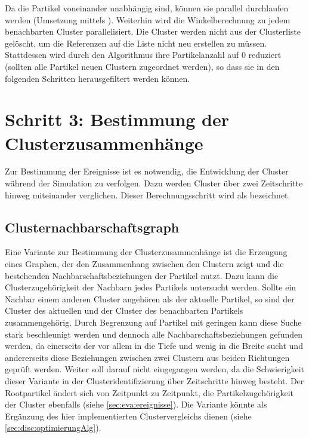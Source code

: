 Da die Partikel voneinander unabhängig sind, können sie parallel durchlaufen werden (Umsetzung mittels ). Weiterhin wird die Winkelberechnung zu jedem benachbarten Cluster parallelisiert.
Die Cluster werden nicht aus der Clusterliste gelöscht, um die Referenzen auf die Liste nicht neu erstellen zu müssen. Stattdessen wird durch den Algorithmus ihre Partikelanzahl auf 0 reduziert (sollten alle Partikel neuen Clustern zugeordnet werden), so dass sie in den folgenden Schritten herausgefiltert werden können.

\section{Schritt 3: Bestimmung der Clusterzusammenhänge}\label{sec:clusterzusammenhaenge}
Zur Bestimmung der Ereignisse ist es notwendig, die Entwicklung der Cluster während der Simulation zu verfolgen. Dazu werden Cluster über zwei Zeitschritte hinweg miteinander verglichen. Dieser Berechnungsschritt wird als \SECC bezeichnet.

\subsection*{Clusternachbarschaftsgraph}
Eine Variante zur Bestimmung der Clusterzusammenhänge ist die Erzeugung eines Graphen, der den Zusammenhang zwischen den Clustern zeigt und die bestehenden Nachbarschaftsbeziehungen der Partikel nutzt. Dazu kann die Clusterzugehörigkeit der Nachbarn jedes Partikels untersucht werden. Sollte ein Nachbar einem anderen Cluster angehören als der aktuelle Partikel, so sind der Cluster des aktuellen und der Cluster des benachbarten Partikels zusammengehörig. Durch Begrenzung auf Partikel mit geringen  kann diese Suche stark beschleunigt werden und dennoch alle Nachbarschaftsbeziehungen gefunden werden, da einerseits der \CFD vor allem in die Tiefe und wenig in die Breite sucht und andererseits diese Beziehungen zwischen zwei Clustern aus beiden Richtungen geprüft werden.
Weiter soll darauf nicht eingegangen werden, da die Schwierigkeit dieser Variante in der Clusteridentifizierung über Zeitschritte hinweg besteht. Der Rootpartikel ändert sich von Zeitpunkt zu Zeitpunkt, die Partikelzugehörigkeit der Cluster ebenfalls (siehe \autoref{sec:eva:ereignisse}). Die Variante könnte als Ergänzung des hier implementierten Clustervergleichs dienen (siehe \autoref{sec:disc:optimierungAlg}).

